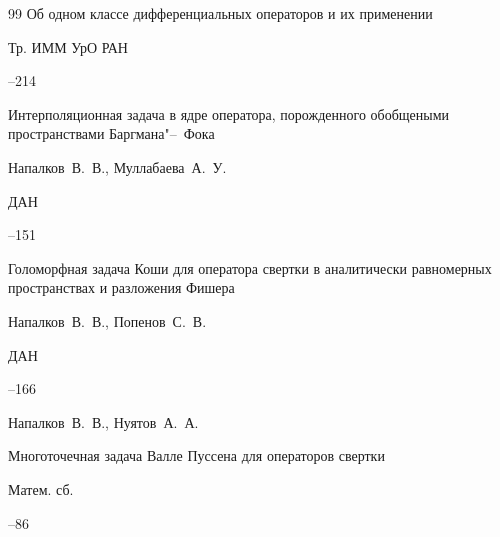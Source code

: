 \begin{thebibliography}{99}
\paper Об одном классе дифференциальных операторов и их применении

\serial Тр. ИММ УрО РАН




--214





\paper Интерполяционная задача в ядре оператора, порожденного обобщеными пространствами Баргмана"--~Фока

\by Напалков~В.~В., Муллабаева~А.~У.

\jour ДАН




--151







\paper Голоморфная задача Коши для оператора свертки в аналитически равномерных пространствах и разложения Фишера

\by Напалков~В.~В., Попенов~С.~В.

\jour ДАН




--166





\by Напалков~В.~В., Нуятов~А.~А.

\paper Многоточечная задача Валле Пуссена для операторов свертки

\jour Матем. сб.




--86





\end{thebibliography}
